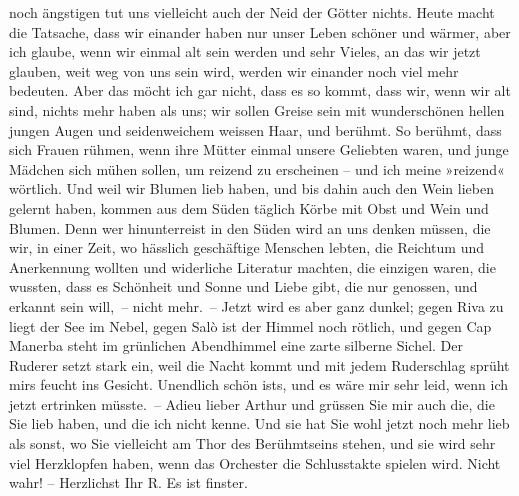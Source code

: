 \begin{ledgroupsized}[t]{13cm}
               noch ängstigen tut uns vielleicht auch der Neid der Götter nichts. Heute macht die
               Tatsache, dass wir einander haben nur unser Leben schöner und wärmer, aber ich
               glaube, wenn wir einmal alt sein werden und sehr Vieles, an das wir jetzt glauben,
               weit weg von uns sein wird, werden wir einander noch viel mehr bedeuten. Aber das
               möcht ich gar nicht, dass es so kommt, {\pb}dass wir, wenn
               wir alt sind, nichts mehr haben als uns; wir sollen Greise sein mit wunderschönen
               hellen jungen Augen und seidenweichem weissen Haar, und  berühmt. So berühmt, dass sich Frauen rühmen, wenn ihre Mütter einmal
               unsere Geliebten waren, und junge Mädchen sich mühen sollen, um reizend zu erscheinen
               – und ich meine »reizend« wörtlich. Und weil wir Blumen lieb haben, und bis dahin
               auch den Wein lieben gelernt haben, kommen aus dem Süden täglich Körbe mit Obst und
               Wein und Blumen. Denn wer hinunterreist in den Süden wird an uns denken müssen, die
               wir, in einer Zeit, wo hässlich geschäftige Menschen lebten, die Reichtum und
               Anerkennung wollten und widerliche Literatur machten, die einzigen waren, die
               wussten, dass es Schönheit und Sonne und Liebe gibt, die nur genossen, und erkannt
               sein will, – nicht mehr. – Jetzt wird es aber ganz dunkel; gegen Riva zu liegt der See im Nebel, gegen Salò ist der Himmel noch rötlich, und gegen Cap Manerba steht im grünlichen Abendhimmel eine zarte silberne
                  {\pb}Sichel. Der Ruderer setzt stark ein, weil die
               Nacht kommt und mit jedem Ruderschlag sprüht mirs feucht ins Gesicht. Unendlich schön
               ists, und es wäre mir sehr leid, wenn ich jetzt ertrinken müsste. – Adieu lieber
               Arthur und grüssen Sie mir auch die, die Sie lieb haben, und die ich nicht kenne. Und
               sie hat Sie wohl jetzt noch mehr lieb als sonst, wo Sie vielleicht am Thor des
               Berühmtseins stehen, und sie wird sehr viel Herzklopfen haben, wenn das Orchester die
               Schlusstakte spielen wird. Nicht wahr! – Herzlichst Ihr\pend
           \pstart \spacefill\mbox{R.}\pend{}\pstart
           \noindent{}Es ist finster.\pend
           
         
         \endnumbering{}\end{ledgroupsized}  \newcommand{\dateiname}{L00493}\newcommand{\titel}{Richard Beer-Hofmann an Arthur Schnitzler, 24. 9. 1895}\newcommand{\editorInnen}{Martin Anton Müller und Gerd-Hermann Susen}
      